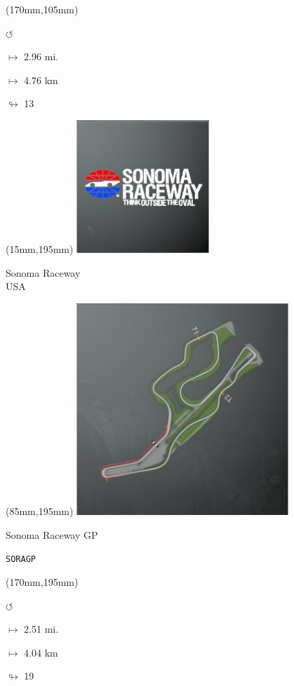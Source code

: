 \begin{textblock*}{30mm}(170mm,105mm)%
\par \Huge$\circlearrowleft$
\Large
\par$\mapsto$ 2.96 mi.
\par$\mapsto$ 4.76 km
\par$\looparrowright$ 13
\end{textblock*}
\begin{textblock*}{60mm}(15mm,195mm)%
\includegraphics[width=50mm]{LG/2015-05-20_00096.png}
\par Sonoma Raceway\\ USA
\end{textblock*}
\begin{textblock*}{80mm}(85mm,195mm)%
\includegraphics[width=80mm]{TR/2015-05-20_00065.png}
\centerline{Sonoma Raceway GP}
\par\hfill\tiny\tt SORAGP\\
\end{textblock*}
\begin{textblock*}{30mm}(170mm,195mm)%
\par \Huge$\circlearrowleft$
\Large
\par$\mapsto$ 2.51 mi.
\par$\mapsto$ 4.04 km
\par$\looparrowright$ 19
\end{textblock*}
\null\newpage

